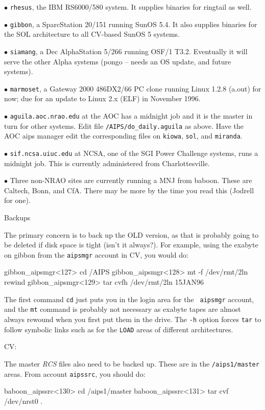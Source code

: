 \item{$\bullet$} {\tt rhesus}, the IBM RS6000/580 system.  It supplies
		 binaries for ringtail as well.
\item{$\bullet$} {\tt gibbon}, a SparcStation 20/151 running SunOS 5.4.
		 It also supplies binaries for the SOL architecture to
		 all CV-based SunOS 5 systems.
\item{$\bullet$} {\tt siamang}, a Dec AlphaStation 5/266 running OSF/1
		 T3.2.  Eventually it will serve the other Alpha systems
		 (pongo -- needs an OS update, and future systems).
\item{$\bullet$} {\tt marmoset}, a Gateway 2000 486DX2/66 PC clone
		 running Linux 1.2.8 (a.out) for now; due for an update
		 to Linux 2.x (ELF) in November 1996.
\item{$\bullet$} {\tt aguila.aoc.nrao.edu} at the AOC has a midnight
		 job and it is the master in turn for other systems.
		 Edit file {\tt /AIPS/do\_daily.aguila} as above.
		 Have the AOC aips manager edit the corresponding
		 files on {\tt kiowa}, {\tt sol}, and {\tt miranda}.
\item{$\bullet$} {\tt sif.ncsa.uiuc.edu} at NCSA, one of the SGI Power
		 Challenge systems, runs a midnight job.  This is
		 currently administered from Charlottesville.
\item{$\bullet$} Three non-NRAO sites are currently running a MNJ from
		 baboon. These are Caltech, Bonn, and CfA.  There may be
		 more by the time you read this (Jodrell for one).
\medskip

\newsubsection Backups

The primary concern is to back up the OLD version, as that is probably
going to be deleted if disk space is tight (isn't it always?).  For
example, using the exabyte on gibbon from the {\tt aipsmgr} account in
CV, you would do:

\fortran
gibbon_aipsmgr<127> cd /AIPS
gibbon_aipsmgr<128> mt -f /dev/rmt/2ln rewind
gibbon_aipsmgr<129> tar cvfh /dev/rmt/2ln 15JAN96
\endfortran
\medskip

The first command {\tt cd} just puts you in the login area for the {\tt
aipsmgr} account, and the {\tt mt} command is probably not necessary as
exabyte tapes are almost always rewound when you first put them in the
drive.  The {\tt -h} option forces {\tt tar} to follow symbolic links
such as for the {\tt LOAD} areas of different architectures.

\item{CV:} {The master {\it RCS\/} files also need to be backed up.
These are in the {\tt /aips1/master} areas.  From account {\tt aipssrc},
you should do:\medskip

\fortran
baboon_aipssrc<130> cd /aips1/master
baboon_aipssrc<131> tar cvf /dev/nrst0 .
\endfortran
}
\medskip

